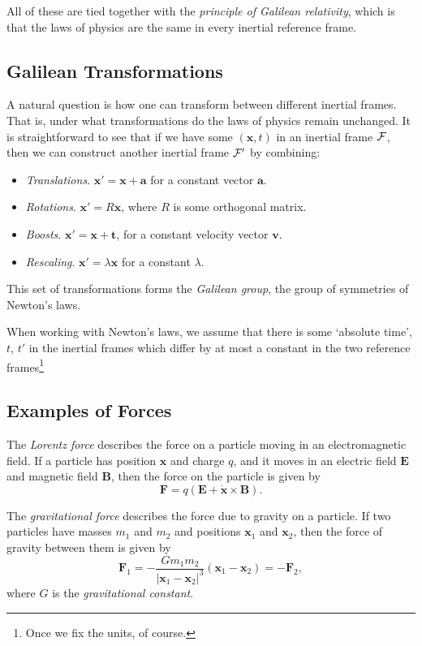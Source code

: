 \documentclass[11pt, a4paper]{scrartcl}
\newcommand{\vv}[1]{\boldsymbol{\mathbf{#1}}}
\theoremstyle{definition}
\newcommand{\vocab}[1]{\emph{#1}}
\begin{document}
All of these are tied together with the \emph{principle of Galilean relativity}, which is that the laws of physics are the same in every inertial reference frame.

\subsection*{Galilean Transformations}

A natural question is how one can transform between different inertial frames. That is, under what transformations do the laws of physics remain unchanged. It is straightforward to see that if we have some $(\vv x, t)$ in an inertial frame $\mathcal{F}$, then we can construct another inertial frame $\mathcal{F}'$ by combining:
\begin{itemize}
	\item \emph{Translations}. $\vv x' = \vv x + \vv a$ for a constant vector $\vv a$.
	\item \emph{Rotations}. $\vv x' = R \vv x$, where $R$ is some orthogonal matrix.
	\item \emph{Boosts}. $\vv x' = \vv x + \vv t$, for a constant velocity vector $\vv v$.
	\item \emph{Rescaling}. $\vv x' = \lambda \vv x$ for a constant $\lambda$. 
\end{itemize}
This set of transformations forms the \emph{Galilean group}, the group of symmetries of Newton's laws.

When working with Newton's laws, we assume that there is some `absolute time', $t$, $t'$ in the inertial frames which differ by at most a constant in the two reference frames\footnote{Once we fix the units, of course.}

\subsection*{Examples of Forces}

The \emph{Lorentz force} describes the force on a particle moving in an electromagnetic field. If a particle has position $\vv x$ and charge $q$, and it moves in an electric field $\vv E$ and magnetic field $\vv B$, then the force on the particle is given by
$$
\vv F = q(\vv E + \dot{\vv x} \times \vv B).
$$


The \emph{gravitational force} describes the force due to gravity on a particle. If two particles have masses $m_1$ and $m_2$ and positions $\vv x_1$ and $\vv x_2$, then the force of gravity between them is given by
$$
\vv F_1 = - \frac{G m_1 m_2}{| \vv x_1 - \vv x_2|^3} (\vv x_1 - \vv x_2) = - \vv F_2,
$$
where $G$ is the \vocab{gravitational constant}.
\end{document}

